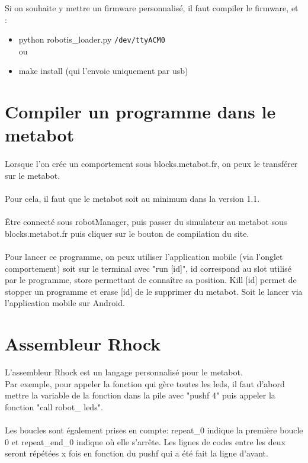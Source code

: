 \documentclass[10pt,a4paper]{report}
\begin{document}
Si on souhaite y mettre un firmware personnalisé, il faut compiler le firmware, et :
\begin{itemize}
\item python robotis\_loader.py \texttt{/dev/ttyACM0}
\\ou
\item make install (qui l'envoie uniquement par usb)
\end{itemize}

\section{Compiler un programme dans le metabot}
\paragraph{}
Lorsque l'on crée un comportement sous blocks.metabot.fr, on peux le transférer sur le metabot.
\paragraph{}
Pour cela, il faut que le metabot soit au minimum dans la version 1.1.
\paragraph{}
Être connecté sous robotManager, puis passer du simulateur au metabot sous blocks.metabot.fr puis cliquer sur le bouton de compilation du site.
\paragraph{}
Pour lancer ce programme, on peux utiliser l'application mobile (via l'onglet comportement) soit sur le terminal avec "run [id]", id correspond au slot utilisé par le programme, store permettant de connaître sa position. Kill [id] permet de stopper un programme et erase [id] de le supprimer du metabot.
Soit le lancer via l'application mobile sur Android.

\section{Assembleur Rhock}
L'assembleur Rhock est un langage personnalisé pour le metabot.\\
Par exemple, pour appeler la fonction qui gère toutes les  leds, il faut d'abord mettre la variable de la fonction dans la pile avec "pushf 4" puis appeler la fonction "call robot\_ leds".
\paragraph{}
Les boucles sont également prises en compte: repeat\_0 indique la première boucle 0 et repeat\_end\_0 indique où elle s'arrête. Les lignes de codes entre les deux seront répétées x fois en fonction du pushf qui a été fait la ligne d'avant.
\end{document}
